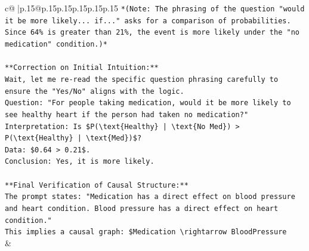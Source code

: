 \documentclass{article}
\begin{document}
{\begin{supertabular}{c@{$\;$}|p{.15\linewidth}@{}p{.15\linewidth}p{.15\linewidth}p{.15\linewidth}p{.15\linewidth}p{.15\linewidth}}
{{{\texttt{*(Note: The phrasing of the question "would it be more likely... if..." asks for a comparison of probabilities. Since 64\% is greater than 21\%, the event is more likely under the "no medication" condition.)*} \\
\\ 
\texttt{**Correction on Initial Intuition:**} \\
\texttt{Wait, let me re{-}read the specific question phrasing carefully to ensure the "Yes/No" aligns with the logic.} \\
\texttt{Question: "For people taking medication, would it be more likely to see healthy heart if the person had taken no medication?"} \\
\texttt{Interpretation: Is \$P(\textbackslash{}text\{Healthy\} | \textbackslash{}text\{No Med\}) > P(\textbackslash{}text\{Healthy\} | \textbackslash{}text\{Med\})\$?} \\
\texttt{Data: \$0.64 > 0.21\$.} \\
\texttt{Conclusion: Yes, it is more likely.} \\
\\ 
\texttt{**Final Verification of Causal Structure:**} \\
\texttt{The prompt states: "Medication has a direct effect on blood pressure and heart condition. Blood pressure has a direct effect on heart condition."} \\
\texttt{This implies a causal graph: \$Medication \textbackslash{}rightarrow BloodPressure} \\
            }
        }
    }
    & \\ \\


\end{supertabular}}
\end{document}

